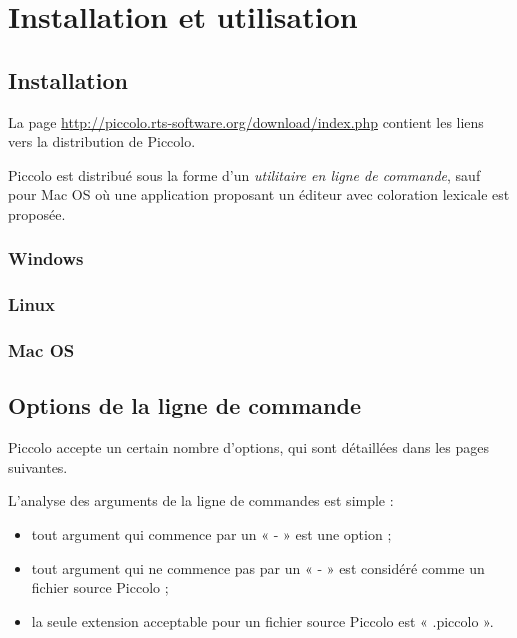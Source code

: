 
\cleardoublepage

\chapter{Installation et utilisation}

\thispagestyle{empty}


\section{Installation}

La page \url{http://piccolo.rts-software.org/download/index.php} contient les liens vers la distribution de Piccolo. 

Piccolo est distribué sous la forme d'un \emph{utilitaire en ligne de commande}, sauf pour Mac OS où une application proposant un éditeur avec coloration lexicale est proposée.

\subsection{Windows}

\subsection{Linux}


\subsection{Mac OS}




\section{Options de la ligne de commande}


Piccolo accepte un certain nombre d’options, qui sont détaillées dans les pages suivantes.

L’analyse des arguments de la ligne de commandes est simple :
\begin{itemize}
  \item tout argument qui commence par un « - » est une option ;
  \item tout argument qui ne commence pas par un « - » est considéré comme un fichier source Piccolo ;
  \item la seule extension acceptable pour un fichier source Piccolo est « .piccolo ».
\end{itemize}

